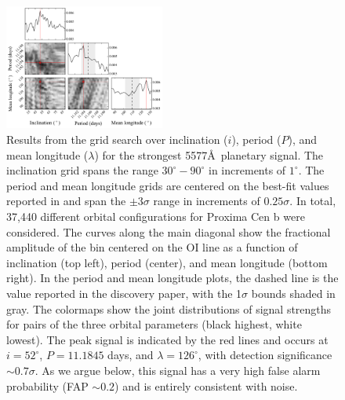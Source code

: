 \documentclass{emulateapj}
\begin{document}
\begin{figure}[bt]
\includegraphics[width=0.47\textwidth]{5577_triangle.pdf}
\caption{Results from the grid search over inclination ($i$), period ($P$), and mean longitude ($\lambda$) for the strongest 5577\AA\ planetary signal. The inclination grid spans the range $30^\circ - 90^\circ$ in increments of $1^\circ$. The period and mean longitude grids are centered on the best-fit values reported in \citet{Anglada-Escude2016} and span the $\pm 3\sigma$ range in increments of $0.25\sigma$. In total, 37,440 different orbital configurations for Proxima Cen b were considered. The curves along the main diagonal show the fractional amplitude of the bin centered on the OI line as a function of inclination (top left), period (center), and mean longitude (bottom right). In the period and mean longitude plots, the dashed line is the value reported in the discovery paper, with the 1$\sigma$ bounds shaded in gray. The colormaps show the joint distributions of signal strengths for pairs of the three orbital parameters (black highest, white lowest). The peak signal is indicated by the red lines and occurs at $i = 52^\circ$, $P = 11.1845$ days, and $\lambda = 126^\circ$, with detection significance ${\sim}0.7\sigma$. As we argue below, this signal has a very high false alarm probability (FAP ${\sim} 0.2$) and is entirely consistent with noise.}
\label{fig:triangle}
\end{figure}
\end{document}
